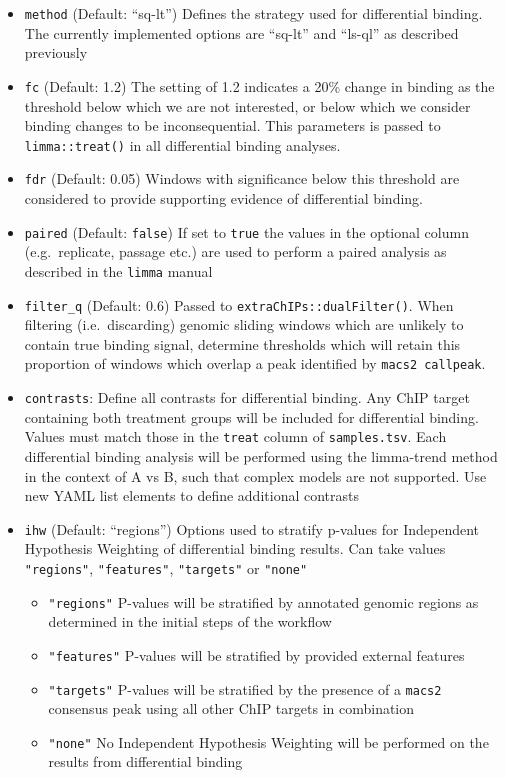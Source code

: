 \documentclass[
]{book}
\providecommand{\tightlist}{%
  \setlength{\itemsep}{0pt}\setlength{\parskip}{0pt}}
\begin{document}
\begin{itemize}
\tightlist
\item
  \texttt{method} (Default: ``sq-lt'') Defines the strategy used for differential binding. The currently implemented options are ``sq-lt'' and ``ls-ql'' as described previously
\item
  \texttt{fc} (Default: 1.2) The setting of 1.2 indicates a 20\% change in binding as the threshold below which we are not interested, or below which we consider binding changes to be inconsequential. This parameters is passed to \texttt{limma::treat()} \citep{treat} in all differential binding analyses.
\item
  \texttt{fdr} (Default: 0.05) Windows with significance below this threshold are considered to provide supporting evidence of differential binding.
\item
  \texttt{paired} (Default: \texttt{false}) If set to \texttt{true} the values in the optional column (e.g.~replicate, passage etc.) are used to perform a paired analysis as described in the \texttt{limma} manual
\item
  \texttt{filter\_q} (Default: 0.6) Passed to \texttt{extraChIPs::dualFilter()}. When filtering (i.e.~discarding) genomic sliding windows which are unlikely to contain true binding signal, determine thresholds which will retain this proportion of windows which overlap a peak identified by \texttt{macs2\ callpeak}.
\item
  \texttt{contrasts}: Define all contrasts for differential binding. Any ChIP target containing both treatment groups will be included for differential binding. Values must match those in the \texttt{treat} column of \texttt{samples.tsv}. Each differential binding analysis will be performed using the limma-trend method in the context of A vs B, such that complex models are not supported. Use new YAML list elements to define additional contrasts
\item
  \texttt{ihw} (Default: ``regions'') Options used to stratify p-values for Independent Hypothesis Weighting\citep{ihw} of differential binding results. Can take values \texttt{"regions"}, \texttt{"features"}, \texttt{"targets"} or \texttt{"none"}

  \begin{itemize}
  \tightlist
  \item
    \texttt{"regions"} P-values will be stratified by annotated genomic regions as determined in the initial steps of the workflow
  \item
    \texttt{"features"} P-values will be stratified by provided external features
  \item
    \texttt{"targets"} P-values will be stratified by the presence of a \texttt{macs2} consensus peak using all other ChIP targets in combination
  \item
    \texttt{"none"} No Independent Hypothesis Weighting will be performed on the results from differential binding
  \end{itemize}
\end{itemize}
\end{document}
